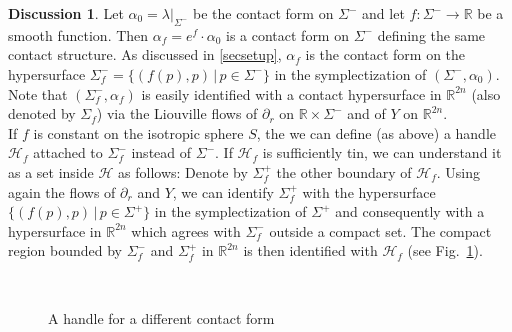 \documentclass[a4paper,12pt,bibliography=totocnumbered,titlepage=false,abstracton,bookmarksnumbered=true]{scrartcl}
\theoremstyle{definition}
\newtheorem{dis}[defn]{Discussion}
\begin{document}
\begin{dis}\label{dishandlesdifferentcontact}
 Let $\alpha_0=\lambda|_{\Sigma^-}$ be the contact form on $\Sigma^-$ and let $f:\Sigma^-\rightarrow\mathbb{R}$ be a smooth function. Then $\alpha_f=e^f{\cdot}\alpha_0$ is a contact form on $\Sigma^-$ defining the same contact structure. As discussed in \ref{secsetup}, $\alpha_f$ is the contact form on the hypersurface $\Sigma^-_f=\big\{(f(p),p)\,|\,p\in\Sigma^-\big\}$ in the symplectization of $(\Sigma^-,\alpha_0)$. Note that $(\Sigma_f^-,\alpha_f)$ is easily identified with a contact hypersurface in $\mathbb{R}^{2n}$ (also denoted by $\Sigma_f$) via the Liouville flows of $\partial_r$ on $\mathbb{R}{\times}\Sigma^-$ and of $Y$ on $\mathbb{R}^{2n}$.\\
 If $f$ is constant on the isotropic sphere $S$, the we can define (as above) a handle $\mathcal{H}_f$ attached to $\Sigma^-_f$ instead of $\Sigma^-$. If $\mathcal{H}_f$ is sufficiently tin, we can understand it as a set inside $\mathcal{H}$ as follows: Denote by $\Sigma_f^+$ the other boundary of $\mathcal{H}_f$. Using again the flows of $\partial_r$ and $Y$, we can identify $\Sigma_f^+$ with the hypersurface $\big\{(f(p),p)\,\big|\,p\in\Sigma^+\big\}$ in the symplectization of $\Sigma^+$ and consequently with a hypersurface in $\mathbb{R}^{2n}$ which agrees with $\Sigma_f^-$ outside a compact set. The compact region bounded by $\Sigma_f^-$ and $\Sigma_f^+$ in $\mathbb{R}^{2n}$ is then identified with $\mathcal{H}_f$ (see Fig.\ \ref{fig2handles2contact}).
 \begin{figure}[!htb]
\centering
 \resizebox{9cm}{!}{}
 \\\caption{\label{fig2handles2contact} A handle for a different contact form}
\end{figure}
\end{dis}
\end{document}

